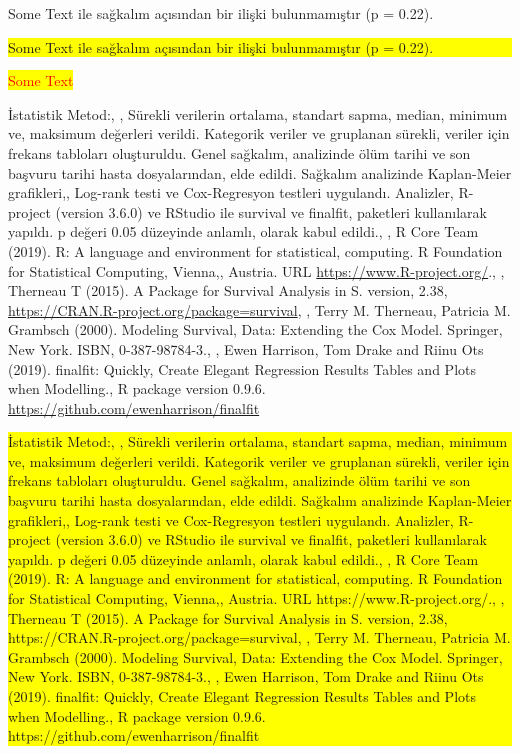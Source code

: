 \documentclass[]{article}
\begin{document}
\pagebreak

Some Text ile sağkalım açısından bir ilişki bulunmamıştır (p = 0.22).

\noindent

\colorbox{yellow}{
\parbox{\dimexpr\linewidth-2\fboxsep}{

Some Text ile sağkalım açısından bir ilişki bulunmamıştır (p = 0.22).

}
}

\colorbox{yellow}{\textcolor{red}{Some Text}}

\pagebreak

İstatistik Metod:, , Sürekli verilerin ortalama, standart sapma, median,
minimum ve, maksimum değerleri verildi. Kategorik veriler ve gruplanan
sürekli, veriler için frekans tabloları oluşturuldu. Genel sağkalım,
analizinde ölüm tarihi ve son başvuru tarihi hasta dosyalarından, elde
edildi. Sağkalım analizinde Kaplan-Meier grafikleri,, Log-rank testi ve
Cox-Regresyon testleri uygulandı. Analizler, R-project (version 3.6.0)
ve RStudio ile survival ve finalfit, paketleri kullanılarak yapıldı. p
değeri 0.05 düzeyinde anlamlı, olarak kabul edildi., , R Core Team
(2019). R: A language and environment for statistical, computing. R
Foundation for Statistical Computing, Vienna,, Austria. URL
\url{https://www.R-project.org/}., , Therneau T (2015). A Package for
Survival Analysis in S. version, 2.38,
\url{https://CRAN.R-project.org/package=survival}, , Terry M. Therneau,
Patricia M. Grambsch (2000). Modeling Survival, Data: Extending the Cox
Model. Springer, New York. ISBN, 0-387-98784-3., , Ewen Harrison, Tom
Drake and Riinu Ots (2019). finalfit: Quickly, Create Elegant Regression
Results Tables and Plots when Modelling., R package version 0.9.6.
\url{https://github.com/ewenharrison/finalfit}

\noindent

\colorbox{yellow}{
\parbox{\dimexpr\linewidth-2\fboxsep}{

İstatistik Metod:, , Sürekli verilerin ortalama, standart sapma, median, minimum ve, maksimum değerleri verildi. Kategorik veriler ve gruplanan sürekli, veriler için frekans tabloları oluşturuldu. Genel sağkalım, analizinde ölüm tarihi ve son başvuru tarihi hasta dosyalarından, elde edildi.  Sağkalım analizinde Kaplan-Meier grafikleri,, Log-rank testi ve Cox-Regresyon testleri uygulandı. Analizler, R-project (version 3.6.0) ve RStudio ile survival ve finalfit, paketleri kullanılarak yapıldı. p değeri 0.05 düzeyinde anlamlı, olarak kabul edildi., , R Core Team (2019). R: A language and environment for statistical, computing. R Foundation for Statistical Computing, Vienna,, Austria. URL https://www.R-project.org/., , Therneau T (2015). A Package for Survival Analysis in S. version, 2.38, https://CRAN.R-project.org/package=survival, , Terry M. Therneau, Patricia M. Grambsch (2000). Modeling Survival, Data: Extending the Cox Model. Springer, New York. ISBN, 0-387-98784-3., , Ewen Harrison, Tom Drake and Riinu Ots (2019). finalfit: Quickly, Create Elegant Regression Results Tables and Plots when Modelling., R package version 0.9.6. https://github.com/ewenharrison/finalfit

}
}
\end{document}
